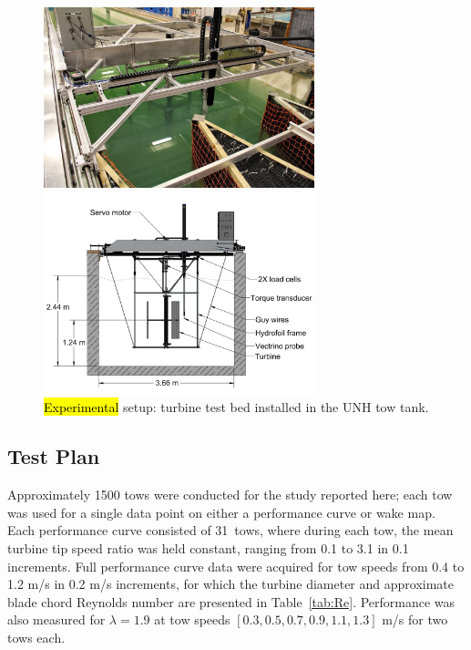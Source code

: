 \documentclass[energies,article,accept,moreauthors,pdftex,10pt,a4paper]{mdpi}
\theoremstyle{mdpi}
\newcounter{ex}
\newcounter{re}
\begin{document}
\begin{figure}[H]
 \centering

 \includegraphics[width=0.7\textwidth]{figures/exp-setup-photo}
 
 \includegraphics[width=0.7\textwidth]{figures/exp_setup_drawing}
 
 \caption{\hl {Experimental} setup: turbine test bed installed in the UNH tow tank.}
 
 \label{fig:exp-setup}
\end{figure}


\subsection{Test Plan}

Approximately 1500 tows were conducted for the study reported here; each tow was
used for a single data point on either a performance curve or wake map. Each
performance curve consisted of 31~tows, where during each tow, the mean turbine
tip speed ratio was held constant, ranging from 0.1 to 3.1 in 0.1 increments. Full
performance curve data were acquired for tow speeds from 0.4 to 1.2 m/s in 0.2 m/s increments, for which the turbine diameter and approximate blade chord Reynolds
number are presented in Table~\ref{tab:Re}. Performance was also measured for
$\lambda=1.9$ at tow speeds $[0.3, 0.5, 0.7, 0.9, 1.1, 1.3]$ m/s for two tows
each.
\end{document}
